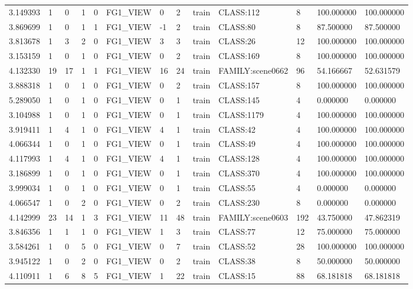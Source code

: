 \begin{tabular}{lllllllllllll}
3.149393 & 1 & 0 & 1 & 0 & FG1\_VIEW & 0 & 2 & train & CLASS:112 & 8 & 100.000000 & 100.000000 \\
3.869699 & 1 & 0 & 1 & 1 & FG1\_VIEW & -1 & 2 & train & CLASS:80 & 8 & 87.500000 & 87.500000 \\
3.813678 & 1 & 3 & 2 & 0 & FG1\_VIEW & 3 & 3 & train & CLASS:26 & 12 & 100.000000 & 100.000000 \\
3.153159 & 1 & 0 & 1 & 0 & FG1\_VIEW & 0 & 2 & train & CLASS:169 & 8 & 100.000000 & 100.000000 \\
4.132330 & 19 & 17 & 1 & 1 & FG1\_VIEW & 16 & 24 & train & FAMILY:scene0662 & 96 & 54.166667 & 52.631579 \\
3.888318 & 1 & 0 & 1 & 0 & FG1\_VIEW & 0 & 2 & train & CLASS:157 & 8 & 100.000000 & 100.000000 \\
5.289050 & 1 & 0 & 1 & 0 & FG1\_VIEW & 0 & 1 & train & CLASS:145 & 4 & 0.000000 & 0.000000 \\
3.104988 & 1 & 0 & 1 & 0 & FG1\_VIEW & 0 & 1 & train & CLASS:1179 & 4 & 100.000000 & 100.000000 \\
3.919411 & 1 & 4 & 1 & 0 & FG1\_VIEW & 4 & 1 & train & CLASS:42 & 4 & 100.000000 & 100.000000 \\
4.066344 & 1 & 0 & 1 & 0 & FG1\_VIEW & 0 & 1 & train & CLASS:49 & 4 & 100.000000 & 100.000000 \\
4.117993 & 1 & 4 & 1 & 0 & FG1\_VIEW & 4 & 1 & train & CLASS:128 & 4 & 100.000000 & 100.000000 \\
3.186899 & 1 & 0 & 1 & 0 & FG1\_VIEW & 0 & 1 & train & CLASS:370 & 4 & 100.000000 & 100.000000 \\
3.999034 & 1 & 0 & 1 & 0 & FG1\_VIEW & 0 & 1 & train & CLASS:55 & 4 & 0.000000 & 0.000000 \\
4.066547 & 1 & 0 & 2 & 0 & FG1\_VIEW & 0 & 2 & train & CLASS:230 & 8 & 0.000000 & 0.000000 \\
4.142999 & 23 & 14 & 1 & 3 & FG1\_VIEW & 11 & 48 & train & FAMILY:scene0603 & 192 & 43.750000 & 47.862319 \\
3.846356 & 1 & 1 & 1 & 0 & FG1\_VIEW & 1 & 3 & train & CLASS:77 & 12 & 75.000000 & 75.000000 \\
3.584261 & 1 & 0 & 5 & 0 & FG1\_VIEW & 0 & 7 & train & CLASS:52 & 28 & 100.000000 & 100.000000 \\
3.945122 & 1 & 0 & 2 & 0 & FG1\_VIEW & 0 & 2 & train & CLASS:38 & 8 & 50.000000 & 50.000000 \\
4.110911 & 1 & 6 & 8 & 5 & FG1\_VIEW & 1 & 22 & train & CLASS:15 & 88 & 68.181818 & 68.181818 \\

\end{tabular}
